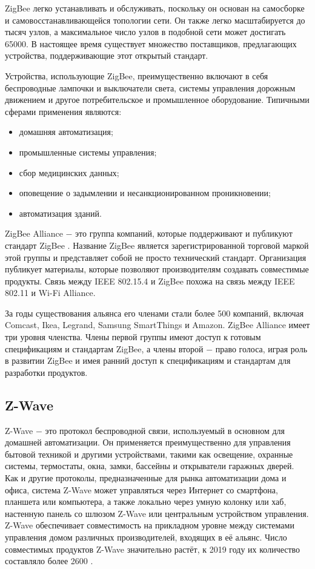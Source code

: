 	ZigBee легко устанавливать и обслуживать, поскольку он основан на самосборке и самовосстанавливающейся
	топологии сети. Он также легко масштабируется до тысяч узлов, а максимальное число узлов в подобной сети
	может достигать 65000. В настоящее время существует множество поставщиков, предлагающих устройства,
	поддерживающие этот открытый стандарт.
	
	Устройства, использующие ZigBee, преимущественно включают в себя беспроводные лампочки 
	и выключатели света, системы управления дорожным движением и другое потребительское и промышленное 
	оборудование. Типичными сферами применения являются:
	\begin{itemize}
		\item домашняя автоматизация;
		\item промышленные системы управления;
		\item сбор медицинских данных;
		\item оповещение о задымлении и несанкционированном проникновении;
		\item автоматизация зданий.
	\end{itemize}

	ZigBee Alliance $-$ это группа компаний, которые поддерживают и публикуют стандарт ZigBee
	 \cite{zigbee-alliance}. Название 
	ZigBee является зарегистрированной торговой маркой этой группы и представляет собой не просто 
	технический стандарт. Организация публикует материалы, которые позволяют производителям 
	создавать совместимые продукты. Связь между IEEE 802.15.4 и ZigBee похожа на связь между 
	IEEE 802.11 и Wi-Fi Alliance.
	
	За годы существования альянса его членами стали более 500 компаний, включая Comcast, Ikea, Legrand, 
	Samsung SmartThings и Amazon. ZigBee Alliance имеет три уровня членства. Члены первой группы 
	имеют доступ к готовым спецификациям и стандартам ZigBee, а члены второй $-$ право голоса, 
	играя роль в развитии ZigBee и имея ранний доступ к спецификациям и стандартам для разработки 
	продуктов.
	
	
	\subsection{Z-Wave}
	Z-Wave $-$ это протокол беспроводной связи, используемый в основном для домашней автоматизации. 
	Он применяется преимущественно для управления бытовой техникой и другими устройствами, такими 
	как освещение, охранные системы, термостаты, окна, замки, бассейны и открыватели гаражных дверей.
	Как и другие протоколы, предназначенные для рынка автоматизации дома и офиса, система Z-Wave может 
	управляться через Интернет со смартфона, планшета или компьютера, а также локально через умную 
	колонку или хаб, настенную панель со шлюзом Z-Wave или центральным устройством управления. 
	Z-Wave обеспечивает совместимость на прикладном уровне между системами управления домом различных 
	производителей, входящих в её альянс. Число совместимых продуктов Z-Wave значительно растёт, 
	к 2019 году их количество составляло более 2600 \cite{z-wave-certified-products}.
	
